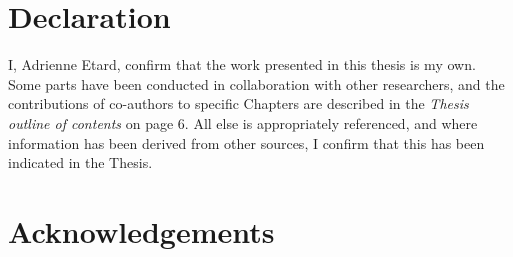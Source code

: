 \documentclass[11pt]{report}
\begin{document}
\begin{refsection}



\chapter*{Declaration}

I, Adrienne Etard, confirm that the work presented in this thesis is my own. Some parts have been conducted in collaboration with other researchers, and the contributions of co-authors to specific Chapters are described in the \textit{Thesis outline of contents} on page 6. All else is appropriately referenced, and where information has been derived from other sources, I confirm that this has been indicated in the Thesis.




\chapter*{Acknowledgements}

\begin{comment}
First and foremost, huge thanks to my primary supervisor, Tim Newbold, whose guidance has been pivotal to the completion of this PhD journey. I am extremely grateful to Tim for enabling, trusting and encouraging me throughout, for the countless opportunities, for his availability and optimism.

I am equally grateful to Alex Pigot for welcoming me in his lab, for his cutting-edge insights on my work, and for the weekly Zoom meetings that made remote-working more bearable throughout the various phases of the Covid-19 pandemic.

I would like to extend my thanks to the wonderful people of CBER, both to those with whom I have directly collaborated and to those who have facilitated my work in this journey with insightful conversations. Thank you for making the workplace a friendly, constructive and welcoming environment.


\end{comment}
\end{refsection}
\end{document}
